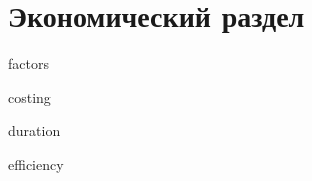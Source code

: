 \section{Экономический раздел}
\label{sec:economics}

{factors}

{costing}

{duration}

{efficiency}

\newpage

